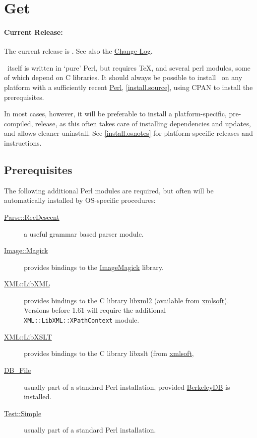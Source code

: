 \documentclass{article}
\begin{document}
\section{Get \LaTeXML}\label{get}
\paragraph{Current Release:}\label{download.current}
The current release is \textbf{\CurrentVersion}.
See also the \href{Changes}{Change Log}.


\LaTeXML\ itself is written in `pure' Perl, but requires \TeX,
and several perl modules, some of which depend on C libraries.
It should always be possible to install \LaTeXML\ on any platform
with a sufficiently recent \href{http://www.perl.org/}{Perl},
\ref{install.source}, using CPAN to install the prerequisites.

In most cases, however, it will be preferable to install
a platform-specific, pre-compiled, release, as this often
takes care of installing dependencies and updates,
and allows cleaner uninstall.  See  \ref{install.osnotes} for
platform-specific releases and instructions.

\subsection{Prerequisites}

The following additional Perl modules are required, but often will
be automatically installed by OS-specific procedures:
\begin{description}
\item[\href{http://search.cpan.org/search?query=Parse::RecDescent&mode=module}{Parse::RecDescent}]
    a useful grammar based parser module.
\item[\href{http://search.cpan.org/search?query=Image::Magick&mode=module}{Image::Magick}]
    provides bindings to the \href{http://www.imagemagick.org/}{ImageMagick} library.
\item[\href{http://search.cpan.org/search?query=XML::LibXML&mode=module}{XML::LibXML}]
    provides bindings to the C library libxml2
    (available from \href{http://www.xmlsoft.org}{xmlsoft}).
    Versions before 1.61 will require the additional \texttt{XML::LibXML::XPathContext} module.
\item[\href{http://search.cpan.org/search?query=XML::LibXSLT&mode=module}{XML::LibXSLT}]
    provides bindings to the C library libxslt
    (from \href{http://www.xmlsoft.org}{xmlsoft},
\item[\href{http://search.cpan.org/search?query=DB_File&mode=module}{DB\_File}]
    usually part of a standard Perl installation, provided
    \href{http://www.sleepycat.com}{BerkeleyDB} is installed.
\item[\href{http://search.cpan.org/search?query=Test::Simple&mode=module}{Test::Simple}]
    usually part of a standard Perl installation.
\end{description}
\end{document}
